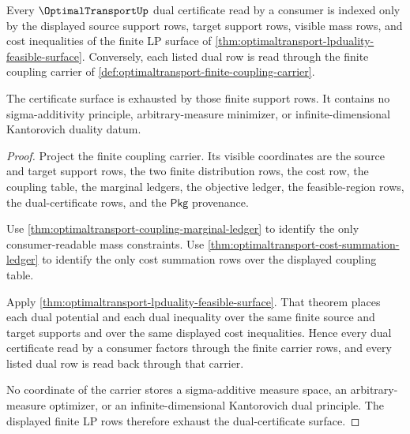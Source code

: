\begin{theorem}
\label{thm:optimaltransport-dual-certificate-finite-support-exhaustion}
Every $\OptimalTransportUp$ dual certificate read by a consumer is indexed only
by the displayed source support rows, target support rows, visible mass rows,
and cost inequalities of the finite LP surface of
\autoref{thm:optimaltransport-lpduality-feasible-surface}. Conversely, each
listed dual row is read through the finite coupling carrier of
\autoref{def:optimaltransport-finite-coupling-carrier}.

The certificate surface is exhausted by those finite support rows. It contains
no sigma-additivity principle, arbitrary-measure minimizer, or
infinite-dimensional Kantorovich duality datum.
\end{theorem}
\begin{proof}
Project the finite coupling carrier. Its visible coordinates are the source
and target support rows, the two finite distribution rows, the cost row, the
coupling table, the marginal ledgers, the objective ledger, the feasible-region
rows, the dual-certificate rows, and the $\mathsf{Pkg}$ provenance.

Use \autoref{thm:optimaltransport-coupling-marginal-ledger} to identify the
only consumer-readable mass constraints. Use
\autoref{thm:optimaltransport-cost-summation-ledger} to identify the only cost
summation rows over the displayed coupling table.

Apply \autoref{thm:optimaltransport-lpduality-feasible-surface}. That theorem
places each dual potential and each dual inequality over the same finite source
and target supports and over the same displayed cost inequalities. Hence every
dual certificate read by a consumer factors through the finite carrier rows,
and every listed dual row is read back through that carrier.

No coordinate of the carrier stores a sigma-additive measure space, an
arbitrary-measure optimizer, or an infinite-dimensional Kantorovich dual
principle. The displayed finite LP rows therefore exhaust the dual-certificate
surface.
\end{proof}

